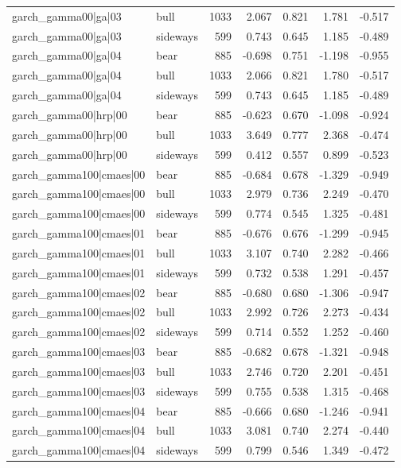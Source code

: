 \begin{table}
\begin{tabular}{llrrrrr}
garch\_gamma00|ga|03 & bull & 1033 & 2.067 & 0.821 & 1.781 & -0.517 \\
garch\_gamma00|ga|03 & sideways & 599 & 0.743 & 0.645 & 1.185 & -0.489 \\
garch\_gamma00|ga|04 & bear & 885 & -0.698 & 0.751 & -1.198 & -0.955 \\
garch\_gamma00|ga|04 & bull & 1033 & 2.066 & 0.821 & 1.780 & -0.517 \\
garch\_gamma00|ga|04 & sideways & 599 & 0.743 & 0.645 & 1.185 & -0.489 \\
garch\_gamma00|hrp|00 & bear & 885 & -0.623 & 0.670 & -1.098 & -0.924 \\
garch\_gamma00|hrp|00 & bull & 1033 & 3.649 & 0.777 & 2.368 & -0.474 \\
garch\_gamma00|hrp|00 & sideways & 599 & 0.412 & 0.557 & 0.899 & -0.523 \\
garch\_gamma100|cmaes|00 & bear & 885 & -0.684 & 0.678 & -1.329 & -0.949 \\
garch\_gamma100|cmaes|00 & bull & 1033 & 2.979 & 0.736 & 2.249 & -0.470 \\
garch\_gamma100|cmaes|00 & sideways & 599 & 0.774 & 0.545 & 1.325 & -0.481 \\
garch\_gamma100|cmaes|01 & bear & 885 & -0.676 & 0.676 & -1.299 & -0.945 \\
garch\_gamma100|cmaes|01 & bull & 1033 & 3.107 & 0.740 & 2.282 & -0.466 \\
garch\_gamma100|cmaes|01 & sideways & 599 & 0.732 & 0.538 & 1.291 & -0.457 \\
garch\_gamma100|cmaes|02 & bear & 885 & -0.680 & 0.680 & -1.306 & -0.947 \\
garch\_gamma100|cmaes|02 & bull & 1033 & 2.992 & 0.726 & 2.273 & -0.434 \\
garch\_gamma100|cmaes|02 & sideways & 599 & 0.714 & 0.552 & 1.252 & -0.460 \\
garch\_gamma100|cmaes|03 & bear & 885 & -0.682 & 0.678 & -1.321 & -0.948 \\
garch\_gamma100|cmaes|03 & bull & 1033 & 2.746 & 0.720 & 2.201 & -0.451 \\
garch\_gamma100|cmaes|03 & sideways & 599 & 0.755 & 0.538 & 1.315 & -0.468 \\
garch\_gamma100|cmaes|04 & bear & 885 & -0.666 & 0.680 & -1.246 & -0.941 \\
garch\_gamma100|cmaes|04 & bull & 1033 & 3.081 & 0.740 & 2.274 & -0.440 \\
garch\_gamma100|cmaes|04 & sideways & 599 & 0.799 & 0.546 & 1.349 & -0.472 \\

\end{tabular}
\end{table}
